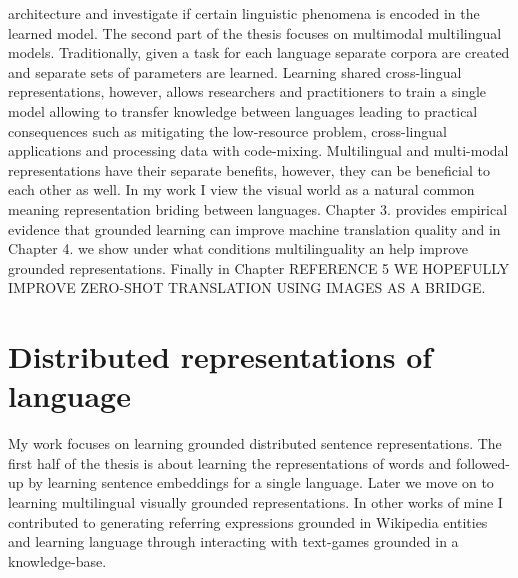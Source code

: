 architecture and investigate if certain linguistic phenomena is encoded in the learned model.
The second part of the thesis focuses on multimodal multilingual models.
Traditionally, given a task for each language separate corpora are created and separate sets of parameters are learned.
Learning shared cross-lingual representations, however, allows researchers and practitioners
to train a single model allowing to transfer knowledge between languages leading to practical consequences
such as mitigating the low-resource problem, cross-lingual applications and processing data with code-mixing.
Multilingual and multi-modal representations have their separate benefits, however, they can be beneficial
to each other as well. In my work I view the visual world as a natural common meaning representation briding
between languages. Chapter 3. provides empirical evidence that grounded learning can improve machine
translation quality and in Chapter 4. we show under what conditions multilinguality an help improve grounded
representations. Finally in Chapter REFERENCE 5 WE HOPEFULLY IMPROVE ZERO-SHOT TRANSLATION USING IMAGES AS A BRIDGE.


\section{Distributed representations of language}
My work focuses on learning grounded distributed sentence representations.
The first half of the thesis is about learning the representations of words and followed-up by learning sentence embeddings for a single language. Later we move on to learning multilingual visually grounded representations. In other works of mine I contributed to generating referring expressions grounded in Wikipedia entities and learning language through interacting with text-games grounded in a knowledge-base.

